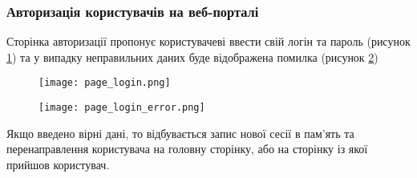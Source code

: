 \subsubsection{Авторизація користувачів на веб-порталі}
\par Сторінка авторизації пропонує користувачеві ввести свій логін та пароль (рисунок \ref{pic:page_login}) та у випадку неправильних даних буде відображена помилка (рисунок \ref{pic:page_login_error})

\begin{figure}[!ht]
\centering
    \texttt{[image: page\_login.png]}
    \vspace{18pt}
    \label{pic:page_login}
\end{figure}

\begin{figure}[!ht]
\centering
    \texttt{[image: page\_login\_error.png]}
    \vspace{18pt}
    \label{pic:page_login_error}
\end{figure}

\par Якщо введено вірні дані, то відбувається запис нової сесії в пам'ять та перенаправлення користувача на головну сторінку, або на сторінку із якої прийшов користувач.

